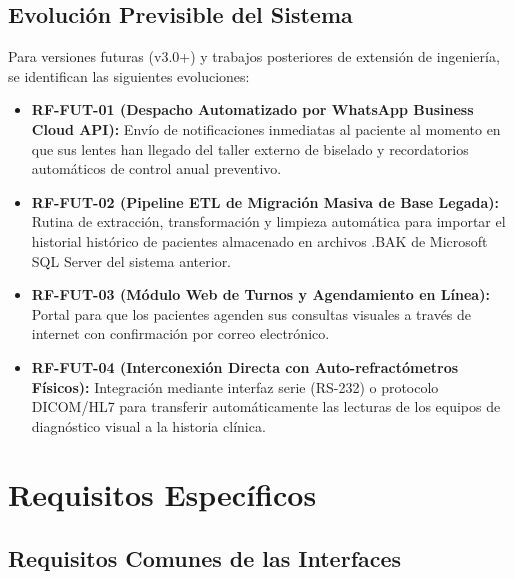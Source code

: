 \documentclass[12pt,a4paper]{report}
\begin{document}
\section{Evolución Previsible del Sistema}
Para versiones futuras (v3.0+) y trabajos posteriores de extensión de ingeniería, se identifican las siguientes evoluciones:
\begin{itemize}
    \item \textbf{RF-FUT-01 (Despacho Automatizado por WhatsApp Business Cloud API):} Envío de notificaciones inmediatas al paciente al momento en que sus lentes han llegado del taller externo de biselado y recordatorios automáticos de control anual preventivo.
    \item \textbf{RF-FUT-02 (Pipeline ETL de Migración Masiva de Base Legada):} Rutina de extracción, transformación y limpieza automática para importar el historial histórico de pacientes almacenado en archivos .BAK de Microsoft SQL Server del sistema anterior.
    \item \textbf{RF-FUT-03 (Módulo Web de Turnos y Agendamiento en Línea):} Portal para que los pacientes agenden sus consultas visuales a través de internet con confirmación por correo electrónico.
    \item \textbf{RF-FUT-04 (Interconexión Directa con Auto-refractómetros Físicos):} Integración mediante interfaz serie (RS-232) o protocolo DICOM/HL7 para transferir automáticamente las lecturas de los equipos de diagnóstico visual a la historia clínica.
\end{itemize}

\chapter{Requisitos Específicos}

\section{Requisitos Comunes de las Interfaces}
\end{document}
